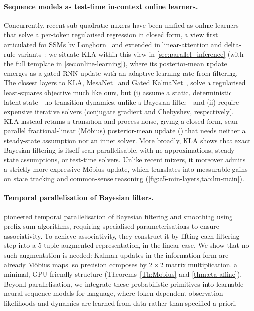 \documentclass{article}
\newcommand{\our}{\textsc{KLA}\xspace}
\begin{document}
\paragraph{Sequence models as test-time in-context online learners.}
Concurrently, recent sub-quadratic mixers have been unified as online learners that solve a per-token regularised regression in closed form, a view first articulated for SSMs by Longhorn~\citep{liu2025longhorn,wang2025test} and extended in linear-attention and delta-rule variants~\citep{yang2023gated,yang2024gated,hatamizadeh2026gated}; we situate \our within this view in \cref{sec:parallel_inference} (with the full template in \cref{sec:online-learning}), where its posterior-mean update emerges as a gated RNN update with an adaptive learning rate from filtering. The closest layers to \our, MesaNet~\citep{von2025mesanet} and Gated KalmaNet~\citep{peng2026gated}, solve a regularised least-squares objective much like ours, but (i) assume a static, deterministic latent state - no transition dynamics, unlike a Bayesian filter - and (ii) require expensive iterative solvers (conjugate gradient and Chebyshev, respectively). \our instead retains a transition and process noise, giving a closed-form, scan-parallel fractional-linear (M\"obius) posterior-mean update () that needs neither a steady-state assumption nor an inner solver. More broadly, \our shows that exact Bayesian filtering is itself scan-parallelisable, with no approximations, steady-state assumptions, or test-time solvers. Unlike recent mixers, it moreover admits a strictly more expressive M\"obius update, which translates into measurable gains on state tracking and common-sense reasoning (\cref{fig:a5-min-layers,tab:lm-main}).

\paragraph{Temporal parallelisation of Bayesian filters.}
\citet{sarkka2020temporal} pioneered temporal parallelisation of Bayesian filtering and smoothing using prefix-sum algorithms, requiring specialised parameterisations to ensure associativity.
To achieve associativity, they construct it by lifting each filtering step into a 5-tuple augmented representation, in the linear case. We show that no such augmentation is needed: Kalman updates in the information form are already M\"{o}bius maps, so precision composes by $2 \times 2$ matrix multiplication, a minimal, GPU-friendly structure (Theorems~\ref{Th:Mobius} and \ref{thm:eta-affine}). Beyond parallelisation, we integrate these probabilistic primitives into learnable neural sequence models for language, where token-dependent observation likelihoods and dynamics are learned from data rather than specified a priori.
\end{document}
